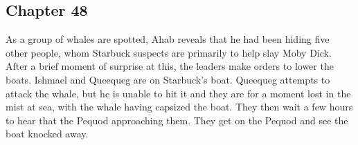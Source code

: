 \subsection{Chapter 48}

As a group of whales are spotted, Ahab reveals that he had been hiding five
other people, whom Starbuck suspects are primarily to help slay Moby Dick.
After a brief moment of surprise at this, the leaders make orders to lower the
boats. Ishmael and Queequeg are on Starbuck's boat. Queequeg attempts to attack
the whale, but he is unable to hit it and they are for a moment lost in the
mist at sea, with the whale having capsized the boat. They then wait a few
hours to hear that the Pequod approaching them. They get on the Pequod and see
the boat knocked away.

